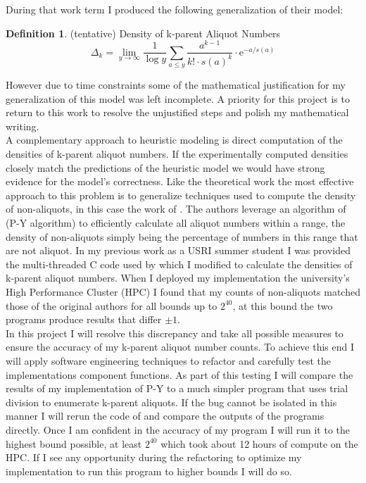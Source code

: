 \documentclass{article}
\theoremstyle{definition}
\newtheorem{definition}{Definition}[section]
\begin{document}
\noindent During that work term I produced the following generalization of their model:
\begin{definition}{(tentative) Density of k-parent Aliquot Numbers}
$$\Delta_k = \lim_{y \to \infty} \frac{1}{\log y}\sum_{a \leq y} \frac{a^{k-1}}{k! \cdot s(a)^k} \cdot \text{e}^{-a/s(a)}$$
\end{definition}
\noindent However due to time constraints some of the mathematical justification for my generalization of this model was left incomplete. A priority for this project is to return to this work to resolve the unjustified steps and polish my mathematical writing.\\

A complementary approach to heuristic modeling is direct computation of the densities of k-parent aliquot numbers. If the experimentally computed densities closely match the predictions of the heuristic model we would have strong evidence for the model's correctness. Like the theoretical work the most effective approach to this problem is to generalize techniques used to compute the density of non-aliquots, in this case the work of \cite{chum_guy_jacobson_mosunov_2018}. The authors leverage an algorithm of \cite{pomYang} (P-Y algorithm) to efficiently calculate all aliquot numbers within a range, the density of non-aliquots simply being the percentage of numbers in this range that are not aliquot. In my previous work as a USRI summer student I was provided the multi-threaded C code used by \cite{chum_guy_jacobson_mosunov_2018} which I modified to calculate the densities of k-parent aliquot numbers. When I deployed my implementation the university's High Performance Cluster (HPC) I found that my counts of non-aliquots matched those of the original authors for all bounds up to $2^{40}$, at this bound the two programs produce results that differ $\pm 1$. \\

In this project I will resolve this discrepancy and take all possible measures to ensure the accuracy of my k-parent aliquot number counts. To achieve this end I will apply software engineering techniques to refactor and carefully test the implementations component functions. As part of this testing I will compare the results of my implementation of P-Y to a much simpler program that uses trial division to enumerate k-parent aliquots. If the bug cannot be isolated in this manner I will rerun the code of \cite{chum_guy_jacobson_mosunov_2018} and compare the outputs of the programs directly. Once I am confident in the accuracy of my program I will run it to the highest bound possible, at least $2^{40}$ which took about 12 hours of compute on the HPC. If I see any opportunity during the refactoring to optimize my implementation to run this program to higher bounds I will do so. \\
\end{document}

